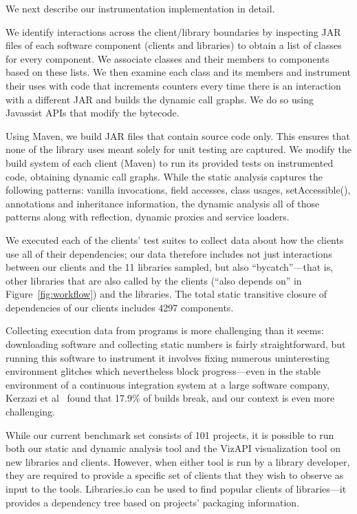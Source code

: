 We next describe our instrumentation implementation in detail.

We identify interactions across the client/library boundaries by
inspecting JAR files of each software component (clients and
libraries) to obtain a list of classes for every component. We
associate classes and their members to components based on these
lists. We then examine each class and its members and instrument 
their uses with code that increments counters every time there is an 
interaction with a different JAR and builds the dynamic call graphs. 
We do so using Javassist APIs that modify the bytecode.

Using Maven, we build JAR files that contain source code only. This ensures that none of the library uses meant solely for unit testing are captured.
We modify the build system of each client (Maven) to run its provided tests on instrumented code, obtaining dynamic call graphs.
While the static analysis captures the following patterns: 
vanilla invocations, field accesses, class usages, setAccessible(), annotations and inheritance information, the dynamic analysis all of those patterns along with reflection,
dynamic proxies and service loaders. 

We executed each of the clients' test suites to collect data about how the clients use all of their dependencies; our data therefore includes not just interactions between our clients and the 11 libraries sampled, but also ``bycatch''---that is, other libraries that are also called by the clients (``also depends on'' in Figure~\ref{fig:workflow}) and the libraries. The total static transitive closure of dependencies of our clients includes 4297 components.

Collecting execution data from programs is more challenging than it seems: downloading software and collecting static numbers is fairly straightforward, but running this software to instrument it involves fixing numerous uninteresting environment glitches which nevertheless block progress---even in the stable environment of a continuous integration system at a large software company, Kerzazi et al~\cite{kerzazi14:_why_do_autom_build_break} found that 17.9\% of builds break, and our context is even more challenging.

While our current benchmark set consists of 101 projects, it is possible to run both our static and dynamic analysis tool and the VizAPI visualization tool on new libraries and clients. However, when either tool is run by a library developer, they are required to provide a specific set of clients that they wish to observe as input to the tools. Libraries.io can be used to find popular clients of libraries---it provides a dependency tree based on projects' packaging information.


